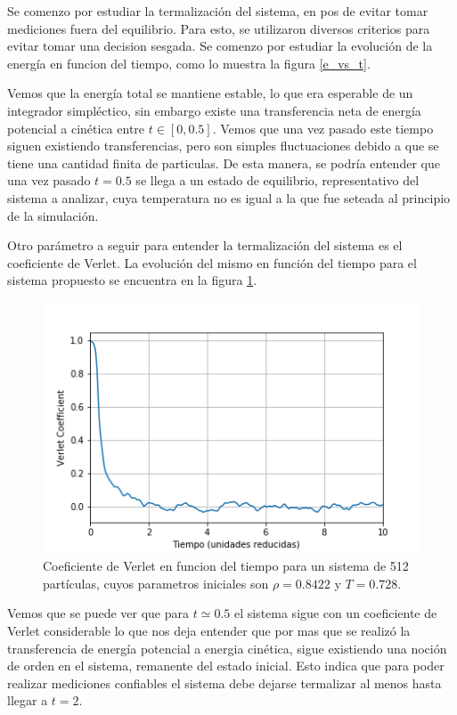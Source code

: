 \documentclass[%
 reprint,
 amsmath,amssymb,
 aps,
]{revtex4-1}
\begin{document}
Se comenzo por estudiar la termalizaci\'on del sistema, en pos de evitar tomar
mediciones fuera del equilibrio. Para esto, se utilizaron diversos criterios
para evitar tomar una decision sesgada. Se comenzo por estudiar la evoluci\'on
de la energ\'ia en funcion del tiempo, como lo muestra la figura \ref{e_vs_t}.

Vemos que la energ\'ia total se mantiene estable, lo que era esperable de un
integrador simpl\'ectico, sin embargo existe una transferencia neta de
energ\'ia potencial a cin\'etica entre $t \in [0, 0.5]$. Vemos que una vez pasado
este tiempo siguen existiendo transferencias, pero son simples fluctuaciones
debido a que se tiene una cantidad finita de particulas. De esta manera, se
podr\'ia entender que una vez pasado $t = 0.5$ se llega a un estado de
equilibrio, representativo del sistema a analizar, cuya temperatura no es igual
a la que fue seteada al principio de la simulaci\'on.

Otro par\'ametro a seguir para entender la termalizaci\'on del sistema es el
coeficiente de Verlet. La evoluci\'on del mismo en funci\'on del tiempo para el
sistema propuesto se encuentra en la figura \ref{verlet_vs_t}.

\begin{figure}
  \begin{center}
  \includegraphics[scale=0.62]{images/verlet_vs_t.png}
  \caption{Coeficiente de Verlet en funcion del tiempo para un sistema de 512
  part\'iculas, cuyos parametros iniciales son $\rho = 0.8422$ y $T = 0.728$.}
  \label{verlet_vs_t}
\end{center}
\end{figure}

Vemos que se puede ver que para $t \simeq 0.5$ el sistema sigue con un
coeficiente de Verlet considerable lo que nos deja entender que por mas que se
realiz\'o la transferencia de energ\'ia potencial a energia cin\'etica, sigue
existiendo una noci\'on de orden en el sistema, remanente del estado inicial.
Esto indica que para poder realizar mediciones confiables el sistema debe
dejarse termalizar al menos hasta llegar a $t = 2$.
\end{document}
